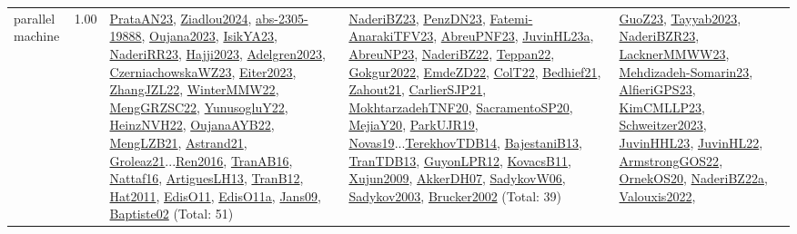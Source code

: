 {\begin{longtable}{p{3cm}r>{\raggedright\arraybackslash}p{6cm}>{\raggedright\arraybackslash}p{6cm}>{\raggedright\arraybackslash}p{8cm}}
\index{parallel machine}\index{Classification!parallel machine}parallel machine &  1.00 & \hyperref[detail:PrataAN23]{PrataAN23}, \hyperref[detail:Ziadlou2024]{Ziadlou2024}, \hyperref[detail:abs-2305-19888]{abs-2305-19888}, \hyperref[detail:Oujana2023]{Oujana2023}, \hyperref[detail:IsikYA23]{IsikYA23}, \hyperref[detail:NaderiRR23]{NaderiRR23}, \hyperref[detail:Hajji2023]{Hajji2023}, \hyperref[detail:Adelgren2023]{Adelgren2023}, \hyperref[detail:CzerniachowskaWZ23]{CzerniachowskaWZ23}, \hyperref[detail:Eiter2023]{Eiter2023}, \hyperref[detail:ZhangJZL22]{ZhangJZL22}, \hyperref[detail:WinterMMW22]{WinterMMW22}, \hyperref[detail:MengGRZSC22]{MengGRZSC22}, \hyperref[detail:YunusogluY22]{YunusogluY22}, \hyperref[detail:HeinzNVH22]{HeinzNVH22}, \hyperref[detail:OujanaAYB22]{OujanaAYB22}, \hyperref[detail:MengLZB21]{MengLZB21}, \hyperref[detail:Astrand21]{Astrand21}, \hyperref[detail:Groleaz21]{Groleaz21}...\hyperref[detail:Ren2016]{Ren2016}, \hyperref[detail:TranAB16]{TranAB16}, \hyperref[detail:Nattaf16]{Nattaf16}, \hyperref[detail:ArtiguesLH13]{ArtiguesLH13}, \hyperref[detail:TranB12]{TranB12}, \hyperref[detail:Hat2011]{Hat2011}, \hyperref[detail:EdisO11]{EdisO11}, \hyperref[detail:EdisO11a]{EdisO11a}, \hyperref[detail:Jans09]{Jans09}, \hyperref[detail:Baptiste02]{Baptiste02} (Total: 51) & \hyperref[detail:NaderiBZ23]{NaderiBZ23}, \hyperref[detail:PenzDN23]{PenzDN23}, \hyperref[detail:Fatemi-AnarakiTFV23]{Fatemi-AnarakiTFV23}, \hyperref[detail:AbreuPNF23]{AbreuPNF23}, \hyperref[detail:JuvinHL23a]{JuvinHL23a}, \hyperref[detail:AbreuNP23]{AbreuNP23}, \hyperref[detail:NaderiBZ22]{NaderiBZ22}, \hyperref[detail:Teppan22]{Teppan22}, \hyperref[detail:Gokgur2022]{Gokgur2022}, \hyperref[detail:EmdeZD22]{EmdeZD22}, \hyperref[detail:ColT22]{ColT22}, \hyperref[detail:Bedhief21]{Bedhief21}, \hyperref[detail:Zahout21]{Zahout21}, \hyperref[detail:CarlierSJP21]{CarlierSJP21}, \hyperref[detail:MokhtarzadehTNF20]{MokhtarzadehTNF20}, \hyperref[detail:SacramentoSP20]{SacramentoSP20}, \hyperref[detail:MejiaY20]{MejiaY20}, \hyperref[detail:ParkUJR19]{ParkUJR19}, \hyperref[detail:Novas19]{Novas19}...\hyperref[detail:TerekhovTDB14]{TerekhovTDB14}, \hyperref[detail:BajestaniB13]{BajestaniB13}, \hyperref[detail:TranTDB13]{TranTDB13}, \hyperref[detail:GuyonLPR12]{GuyonLPR12}, \hyperref[detail:KovacsB11]{KovacsB11}, \hyperref[detail:Xujun2009]{Xujun2009}, \hyperref[detail:AkkerDH07]{AkkerDH07}, \hyperref[detail:SadykovW06]{SadykovW06}, \hyperref[detail:Sadykov2003]{Sadykov2003}, \hyperref[detail:Brucker2002]{Brucker2002} (Total: 39) & \hyperref[detail:GuoZ23]{GuoZ23}, \hyperref[detail:Tayyab2023]{Tayyab2023}, \hyperref[detail:NaderiBZR23]{NaderiBZR23}, \hyperref[detail:LacknerMMWW23]{LacknerMMWW23}, \hyperref[detail:Mehdizadeh-Somarin23]{Mehdizadeh-Somarin23}, \hyperref[detail:AlfieriGPS23]{AlfieriGPS23}, \hyperref[detail:KimCMLLP23]{KimCMLLP23}, \hyperref[detail:Schweitzer2023]{Schweitzer2023}, \hyperref[detail:JuvinHHL23]{JuvinHHL23}, \hyperref[detail:JuvinHL22]{JuvinHL22}, \hyperref[detail:ArmstrongGOS22]{ArmstrongGOS22}, \hyperref[detail:OrnekOS20]{OrnekOS20}, \hyperref[detail:NaderiBZ22a]{NaderiBZ22a}, \hyperref[detail:Valouxis2022]{Valouxis2022}, 
\end{longtable}}
